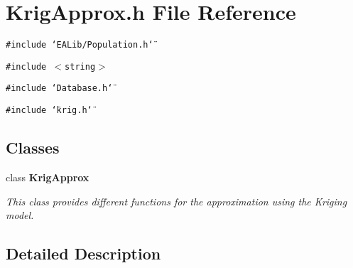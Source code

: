 \section{Krig\-Approx.h File Reference}
\label{KrigApprox_8h}
{\tt \#include \char`\"{}EALib/Population.h\char`\"{}}\par
{\tt \#include $<$string$>$}\par
{\tt \#include \char`\"{}Database.h\char`\"{}}\par
{\tt \#include \char`\"{}krig.h\char`\"{}}\par
\subsection*{Classes}
\begin{CompactItemize}
\item 
class {\bf Krig\-Approx}
\begin{CompactList}\small\item\em This class provides different functions for the approximation using the Kriging model. \item\end{CompactList}\end{CompactItemize}


\subsection{Detailed Description}

